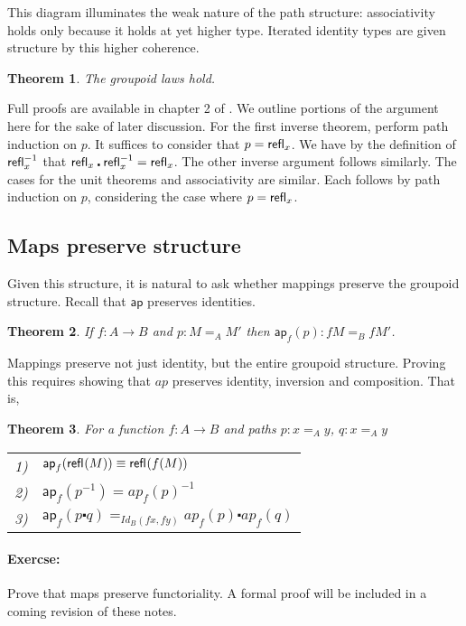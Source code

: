 \documentclass[12pt]{article}
\newcommand{\Ap}{\mathsf{ap}}
\newtheorem{thm}{Theorem}
\begin{document}
This diagram illuminates the weak nature of the path structure: 
associativity holds only because it holds at yet higher type.
Iterated identity types are given structure by this higher coherence.

\begin{thm}
The groupoid laws hold.
\end{thm}

Full proofs are available in chapter 2 of \cite{HoTTBook2013}. We outline
portions of the argument here for the sake of later discussion.
For the first inverse theorem, perform path induction on $p$.  It suffices to consider
that $p = \mathsf{refl}_{x}$.  We have by the definition of $\mathsf{refl}_{x}^{-1}$ that
$\mathsf{refl}_{x} \centerdot \mathsf{refl}_{x}^{-1} = \mathsf{refl}_{x}$.  The other inverse argument follows
similarly.  The cases for the unit theorems and associativity are similar.  Each follows
by path induction on $p$, considering the case where $p = \mathsf{refl}_{x}$.

\subsection{Maps preserve structure}

Given this structure, it is natural to ask whether mappings preserve the 
groupoid structure.  Recall that $\Ap$ preserves identities.

\begin{thm}
If $f : A \rightarrow B$ and $p : M =_A M'$ then $\Ap_f(p) : f M =_B f M'$.
\end{thm}

Mappings preserve not just identity, but the entire groupoid structure.
Proving this requires showing that $ap$ preserves identity, inversion
and composition.  That is,

\begin{thm}
For a function $f : A \rightarrow B$ and paths $p : x =_A y$, $q : x =_A y$
\begin{tabular}{l l}
1) & $\Ap_f(\refl{}(M)) \equiv \refl{}(f(M))$ \\
2) & $\Ap_f(p^{-1}) = ap_f(p)^{-1}$ \\
3) & $\Ap_f(p \centerdot q) =_{Id_B(fx, fy)} ap_f(p) \centerdot ap_f(q)$ \\
\end{tabular}
\end{thm}

\paragraph{Exercse:} Prove that maps preserve functoriality.
A formal proof will be included in a coming revision of these notes.
\end{document}
